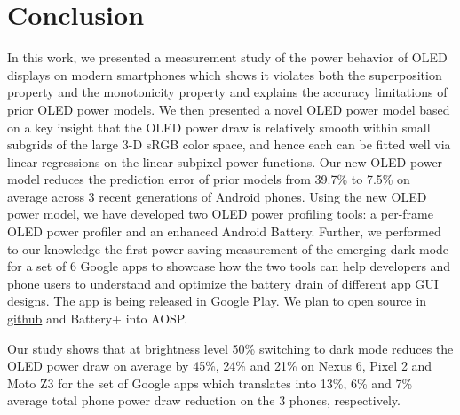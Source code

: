 \section{Conclusion}
\label{sec:conc}

In this work, we presented a measurement study of the power behavior
of OLED displays on modern smartphones which shows it violates both the
superposition property and the monotonicity property and explains the
accuracy limitations of prior OLED power models. We then presented a
novel OLED power model based on a key
insight that the OLED power draw is relatively smooth within small
subgrids of the large 3-D sRGB color space, and hence each can be fitted
well via linear regressions on the linear subpixel power functions.
Our new OLED power model reduces the prediction error of prior models
from 39.7\% to 7.5\% on average across 3 recent generations of Android
phones.
Using the new OLED power model, we have developed two OLED power
profiling tools: a per-frame OLED power profiler and an enhanced Android Battery.
%
Further, we performed to our knowledge the first power saving
measurement of the emerging dark mode for a set of 6 Google
apps to showcase how the two tools can help developers
and phone users to understand and optimize the battery drain of
different app GUI designs.
The \href{https://play.google.com/store/apps/details?id=com.pdeveloper.pcav5}{\name app} is being released in Google Play.
We
plan to open source \appwithlink in \url{github} and Battery+ into AOSP.



Our study shows that at brightness level 50\%
switching to dark mode reduces the OLED
power draw on average by 45\%, 24\% and 21\% on Nexus 6,
Pixel 2 and Moto Z3 for the set of
Google apps which translates into 13\%, 6\% and 7\%
average total phone power draw reduction on the 3 phones, respectively.
\fi
